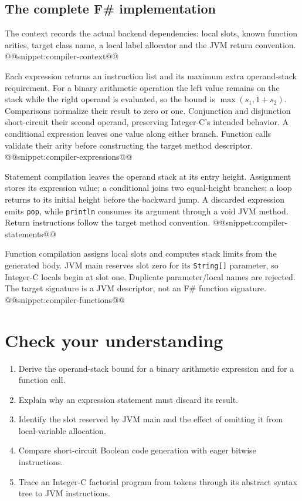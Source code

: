 \subsection{The complete F\# implementation}\label{sec:fsharp-code-generation}
The context records the actual backend dependencies: local slots, known function arities, target class name, a local label allocator and the JVM return convention.
@@snippet:compiler-context@@

Each expression returns an instruction list and its maximum extra operand-stack requirement.
For a binary arithmetic operation the left value remains on the stack while the right operand is evaluated, so the bound is $\max(s_1,1+s_2)$.
Comparisons normalize their result to zero or one.
Conjunction and disjunction short-circuit their second operand, preserving Integer-C's intended behavior.
A conditional expression leaves one value along either branch.
Function calls validate their arity before constructing the target method descriptor.
@@snippet:compiler-expressions@@

Statement compilation leaves the operand stack at its entry height.
Assignment stores its expression value; a conditional joins two equal-height branches; a loop returns to its initial height before the backward jump.
A discarded expression emits \texttt{pop}, while \texttt{println} consumes its argument through a void JVM method.
Return instructions follow the target method convention.
@@snippet:compiler-statements@@

Function compilation assigns local slots and computes stack limits from the generated body.
JVM main reserves slot zero for its \texttt{String[]} parameter, so Integer-C locals begin at slot one.
Duplicate parameter/local names are rejected.
The target signature is a JVM descriptor, not an F\# function signature.
@@snippet:compiler-functions@@

\section{Check your understanding}
\begin{enumerate}
\item Derive the operand-stack bound for a binary arithmetic expression and for a function call.
\item Explain why an expression statement must discard its result.
\item Identify the slot reserved by JVM main and the effect of omitting it from local-variable allocation.
\item Compare short-circuit Boolean code generation with eager bitwise instructions.
\item Trace an Integer-C factorial program from tokens through its abstract syntax tree to JVM instructions.
\end{enumerate}

